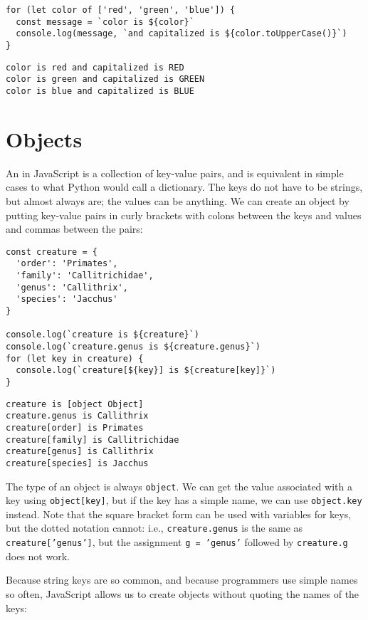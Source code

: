 \begin{verbatim}
for (let color of ['red', 'green', 'blue']) {
  const message = `color is ${color}`
  console.log(message, `and capitalized is ${color.toUpperCase()}`)
}
\end{verbatim}

\begin{verbatim}
color is red and capitalized is RED
color is green and capitalized is GREEN
color is blue and capitalized is BLUE
\end{verbatim}

\section{Objects}\label{s:basics-objects}

An  in JavaScript is a collection of key-value pairs,
and is equivalent in simple cases to what Python would call a dictionary.
The keys do not have to be strings,
but almost always are;
the values can be anything.
We can create an object by putting key-value pairs in curly brackets
with colons between the keys and values
and commas between the pairs:

\begin{verbatim}
const creature = {
  'order': 'Primates',
  'family': 'Callitrichidae',
  'genus': 'Callithrix',
  'species': 'Jacchus'
}

console.log(`creature is ${creature}`)
console.log(`creature.genus is ${creature.genus}`)
for (let key in creature) {
  console.log(`creature[${key}] is ${creature[key]}`)
}
\end{verbatim}

\begin{verbatim}
creature is [object Object]
creature.genus is Callithrix
creature[order] is Primates
creature[family] is Callitrichidae
creature[genus] is Callithrix
creature[species] is Jacchus
\end{verbatim}

The type of an object is always \texttt{object}.
We can get the value associated with a key using \texttt{object{[}key{]}},
but if the key has a simple name,
we can use \texttt{object.key} instead.
Note that the square bracket form can be used with variables for keys,
but the dotted notation cannot:
i.e.,
\texttt{creature.genus} is the same as \texttt{creature{[}'genus'{]}},
but the assignment \texttt{g\ =\ 'genus'} followed by \texttt{creature.g} does not work.

Because string keys are so common,
and because programmers use simple names so often,
JavaScript allows us to create objects without quoting the names of the keys:


